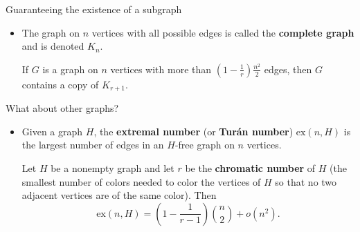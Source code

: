 \documentclass{beamer}
\theoremstyle{plain}
\begin{document}
	\begin{frame}{Guaranteeing the existence of a subgraph}
		\begin{itemize}

			\begin{theorem}[W. Mantel - 1907]
				If $G$ is a graph on $n$ vertices with more than $\lfloor n/2\rfloor \lceil n/2 \rceil$ edges, then $G$ contains a triangle.
			\end{theorem}

			\pause

			\item The graph on $n$ vertices with all possible edges is called the \textbf{complete graph} and is denoted $K_n$.

			\pause

			\begin{theorem}[P. Tur\'an - 1941]
				If $G$ is a graph on $n$ vertices with more than $(1-\frac{1}{r})\frac{n^2}{2}$ edges, then $G$ contains a copy of $K_{r+1}$.
			\end{theorem}
		\end{itemize}
	\end{frame}


	\begin{frame}{What about other graphs?}
		\begin{itemize}
			\item Given a graph $H$, the \textbf{extremal number} (or \textbf{Tur\'an number}) $\text{ex}(n, H)$ is the largest number of edges in an $H$-free graph on $n$ vertices.

			\pause

			\begin{theorem}
				Let $H$ be a nonempty graph and let $r$ be the \textbf{chromatic number} of $H$ (the smallest number of colors needed to color the vertices of $H$ so that no two adjacent vertices are of the same color). Then
				\[
					\text{ex}(n, H) = \left(1-\frac{1}{r-1}\right)\binom{n}{2} + o(n^2).
				\]
			\end{theorem}


		\end{itemize}
	\end{frame}
\end{document}
